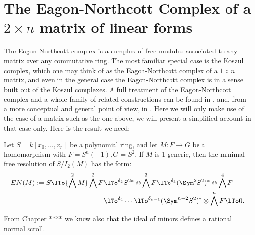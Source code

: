 \section{The Eagon-Northcott Complex of a $2\times n$ matrix of linear forms}

The Eagon-Northcott complex is a complex of free modules associated to any matrix over any commutative ring. The most familiar special case is the Koszul complex, which one may think of as the Eagon-Northcott complex of a $1\times n$ matrix, and  even in the general case the Eagon-Northcott complex is in a sense built out of the Koszul complexes. A full treatment of the Eagon-Northcott complex and a whole family of related constructions can be found in 
\cite[Appendix ***]{Eisenbud1995}, and, from a more conceptual and general point of view, in \cite{Weyman-book}. Here we will only
make use of the case of a matrix such as the one above, we will present a simplified account in that case only. Here is the result we need:

\begin{theorem}\label{Eagon-Northcott}
 Let $S = k[x_0,\dots, x_r]$ be a polynomial ring,  and let $M: F\to G$ be a homomorphism with
 $F = S^n(-1), G= S^2$. If $M$ is 1-generic, then the minimal free resolution of $S/I_2(M)$ has the form:
\begin{align*}
EN(M) := 
S \lTo{\bigwedge^2 M} 
 \bigwedge^2 F&
 \lTo^{\delta_{2}}
 S^{2*}\otimes \bigwedge^3 F  \lTo^{\delta_{3}}
  (\Sym^2S^{2})^*\otimes\bigwedge^4F  \\
 &\lTo^{\delta_{4}}\cdots\lTo^{\delta_{n-1}} 
(\Sym^{n-2}S^{2})^*\otimes\bigwedge^nF 
 \lTo 0.
\end{align*}
\end{theorem}

From Chapter **** we know also that the ideal of minors defines a rational normal scroll.

